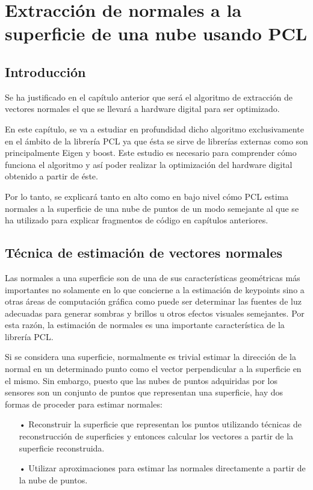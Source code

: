 \chapter{Extracción de normales a la superficie de una nube usando PCL}

\section{Introducción}
Se ha justificado en el capítulo anterior que será el algoritmo de extracción de vectores normales el que se llevará a hardware digital para ser optimizado. 

En este capítulo, se va a estudiar en profundidad dicho algoritmo exclusivamente en el ámbito de la librería PCL ya que ésta se sirve de librerías externas como son principalmente Eigen y boost. Este estudio es necesario para comprender cómo funciona el algoritmo y así poder realizar la optimización del hardware digital obtenido a partir de éste.

Por lo tanto, se explicará tanto en alto como en bajo nivel cómo PCL estima normales a la superficie de una nube de puntos de un modo semejante al que se ha utilizado para explicar fragmentos de código en capítulos anteriores.


\section{Técnica de estimación de vectores normales}



Las normales a una superficie son de una de sus características geométricas más importantes no solamente en lo que concierne a la estimación de keypoints sino a otras áreas de computación gráfica como puede ser determinar las fuentes de luz adecuadas para generar sombras y brillos u otros efectos visuales semejantes. Por esta razón, la estimación de normales es una importante característica de la librería PCL.

Si se considera una superficie, normalmente es trivial estimar la dirección de la normal en un determinado punto como el vector perpendicular a la superficie en el mismo. Sin embargo, puesto que las nubes de puntos adquiridas por los sensores son un conjunto de puntos que representan una superficie, hay dos formas de proceder para estimar normales:

\begin{itemize}
\item[•]Reconstruir la superficie que representan los puntos utilizando técnicas de reconstrucción de superficies y entonces calcular los vectores a partir de la superficie reconstruida.
\item[•]Utilizar aproximaciones para estimar las normales directamente a partir de la nube de puntos.
\end{itemize}

